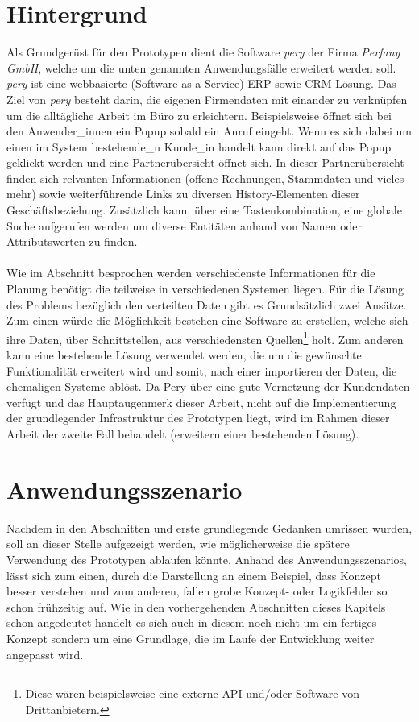 \documentclass[Bachelorarbeit.tex]{subfiles}
\begin{document}
\section{Hintergrund}
\label{chap:einfuehrung:sec:hintergrund}
Als Grundgerüst für den Prototypen dient die Software \textit{pery} der Firma \textit{Perfany GmbH}, welche um die unten genannten Anwendungsfälle erweitert werden soll. 
\textit{pery} ist eine webbasierte (Software as a Service) \ac{ERP} sowie \ac{CRM} Lösung.
Das Ziel von \textit{pery} besteht darin, die eigenen Firmendaten mit einander zu verknüpfen um die alltägliche Arbeit im Büro zu erleichtern.
Beispielsweise öffnet sich bei den Anwender\_innen ein Popup sobald ein Anruf eingeht. 
Wenn es sich dabei um einen im System bestehende\_n Kunde\_in handelt kann direkt auf das Popup geklickt werden und eine Partnerübersicht öffnet sich.
In dieser Partnerübersicht finden sich relvanten Informationen (offene Rechnungen, Stammdaten und vieles mehr) sowie weiterführende Links zu diversen History-Elementen dieser Geschäftsbeziehung.
Zusätzlich kann, über eine Tastenkombination, eine globale Suche aufgerufen werden um diverse Entitäten anhand von Namen oder Attributswerten zu finden. \\
\\
Wie im Abschnitt  besprochen werden verschiedenste Informationen für die Planung benötigt die teilweise in verschiedenen Systemen liegen. 
Für die Lösung des Problems bezüglich den verteilten Daten gibt es Grundsätzlich zwei Ansätze.
Zum einen würde die Möglichkeit bestehen eine Software zu erstellen, welche sich ihre Daten, über Schnittstellen, aus verschiedensten Quellen\footnote{Diese wären beispielsweise eine externe \ac{API} und/oder Software von Drittanbietern.} holt.
Zum anderen kann eine bestehende Lösung verwendet werden, die um die gewünschte Funktionalität erweitert wird und somit, nach einer importieren der Daten, die ehemaligen Systeme ablöst. 
Da Pery über eine gute Vernetzung der Kundendaten verfügt und das Hauptaugenmerk dieser Arbeit, nicht auf die Implementierung der grundlegender Infrastruktur des Prototypen liegt, wird im Rahmen dieser Arbeit der zweite Fall behandelt (erweitern einer bestehenden Lösung).
\newpage


\section{Anwendungsszenario}
Nachdem in den Abschnitten  und  erste grundlegende Gedanken umrissen wurden, soll an dieser Stelle aufgezeigt werden, wie möglicherweise die spätere Verwendung des Prototypen ablaufen könnte.
Anhand des Anwendungsszenarios, lässt sich zum einen, durch die Darstellung an einem Beispiel, dass Konzept besser verstehen und zum anderen, fallen grobe Konzept- oder Logikfehler so schon frühzeitig auf.
Wie in den vorhergehenden Abschnitten dieses Kapitels schon angedeutet handelt es sich auch in diesem noch nicht um ein fertiges Konzept sondern um eine Grundlage, die im Laufe der Entwicklung weiter angepasst wird.
\end{document}
